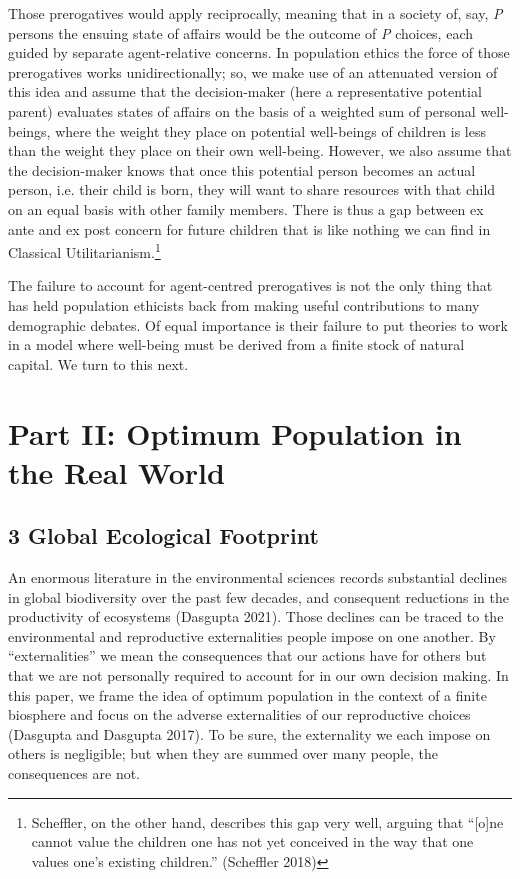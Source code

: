 \documentclass[man,11pt,a4paper,floatsintext]{apa7}
\begin{document}
Those prerogatives would apply reciprocally, meaning that in a society of, say, \textit{P} persons the ensuing state of affairs would be the outcome of \textit{P} choices, each guided by separate agent-relative concerns. In population ethics the force of those prerogatives works unidirectionally; so, we make use of an attenuated version of this idea and assume that the decision-maker (here a representative potential parent) evaluates states of affairs on the basis of a weighted sum of personal well-beings, where the weight they place on potential well-beings of children is less than the weight they place on their own well-being. However, we also assume that the decision-maker knows that once this potential person becomes an actual person, i.e. their child is born, they will want to share resources with that child on an equal basis with other family members. There is thus a gap between ex ante and ex post concern for future children that is like nothing we can find in Classical Utilitarianism.\footnote{Scheffler, on the other hand, describes this gap very well, arguing that ``[o]ne cannot value the children one has not yet conceived in the way that one values one's existing children.'' (Scheffler 2018)}

The failure to account for agent-centred prerogatives is not the only thing that has held population ethicists back from making useful contributions to many demographic debates. Of equal importance is their failure to put theories to work in a model where well-being must be derived from a finite stock of natural capital. We turn to this next.

\section{Part II: Optimum Population in the Real World}

\subsection{3 Global Ecological Footprint}

An enormous literature in the environmental sciences records substantial declines in global biodiversity over the past few decades, and consequent reductions in the productivity of ecosystems (Dasgupta 2021). Those declines can be traced to the environmental and reproductive externalities people impose on one another. By ``externalities'' we mean the consequences that our actions have for others but that we are not personally required to account for in our own decision making. In this paper, we frame the idea of optimum population in the context of a finite biosphere and focus on the adverse externalities of our reproductive choices (Dasgupta and Dasgupta 2017). To be sure, the externality we each impose on others is negligible; but when they are summed over many people, the consequences are not.
\end{document}
